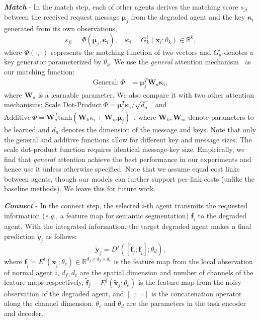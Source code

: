 \textit{\textbf{Match}} - 
In the match step, each of other agents derives the matching score $s_{ji}$ between the received request message $\bm{\mu}_j$ from the degraded agent and the key $\bm{\kappa}_i$ generated from its own observations,
\begin{equation}
     s_{ji} = \Phi(\bm{\mu}_j, \bm{\kappa}_i), \quad \bm{\kappa}_i = G^i_k(\bm{x}_i;\theta_k)\in\mathbb{R}^k,
\end{equation}
where $\Phi(\cdot, \cdot)$ represents the matching function of two vectors and $G^i_k$ denotes a key generator parameterized by $\theta_k$. 
We use the \textit{general} attention mechanism~\cite{luong2015effective} as our matching function:
\begin{align}\label{eq:attention}
    \text{General:}\ \Phi &= \bm{\mu}_j^T \bm{W}_a \bm{\kappa}_i,
\end{align}
where $\bm{W}_a$ is a learnable parameter. 
We also compare it with two other attention mechanisms: $\text{Scale Dot-Product}\ \Phi = \bm{\mu}_j^T\bm{\kappa}_i/\sqrt{d_n}$~\cite{vaswani2017attention} and $\text{Additive}\ \Phi = \bm{W}_a^T \text{tanh}(\bm{W}_k\kappa_i + \bm{W}_m \bm{\mu}_j)$~\cite{bahdanau2014neural},
where $\bm{W}_k, \bm{W}_m$ denote parameters to be learned and $d_n$ denotes the dimension of the message and keys. Note that only the general and additive functions allow for different key and message sizes. The scale dot-product function requires identical message-key size.
Empirically, we find that \textit{general} attention achieve the best performance in our experiments and hence use it unless otherwise specified. Note that we assume equal cost links between agents, though our models can further support per-link costs (unlike the baseline methods). We leave this for future work.

\textit{\textbf{Connect}} - 
In the connect step, the selected $\hat{i}$-th agent transmits the requested information (\textit{e.g.,} a feature map for semantic segmentation) $\bm{f}_{\hat{i}}$ to the degraded agent. 
With the integrated information, the target degraded agent makes a final prediction  $\tilde{y}_j$ as follows:
\begin{equation}\label{eq:inference}
\bm{\tilde{y}}_j=D^j([\tilde{\bm{f}}_j; \bm{f}_{\hat{i}} ];\theta_d),
\end{equation}
where $\bm{f}_{\hat{i}} = E^i(\bm{x}_{\hat{i}};\theta_e)\in\mathbb{R}^{d_f \times d_f \times d_c}$ is the feature map from the local observation of normal agent $\hat{i}$, $d_f, d_c$ are the spatial dimension and number of channels of the feature maps respectively, $\tilde{\bm{f}}_j = E^j(\bm{\tilde{x}}_j;\theta_e)$ is the feature map from the noisy observation of the degraded agent, and $[\cdot\; ; \; \cdot]$ is the concatenation operator along the channel dimension. $\theta_e$ and $\theta_d$ are the parameters in the task encoder and decoder.

